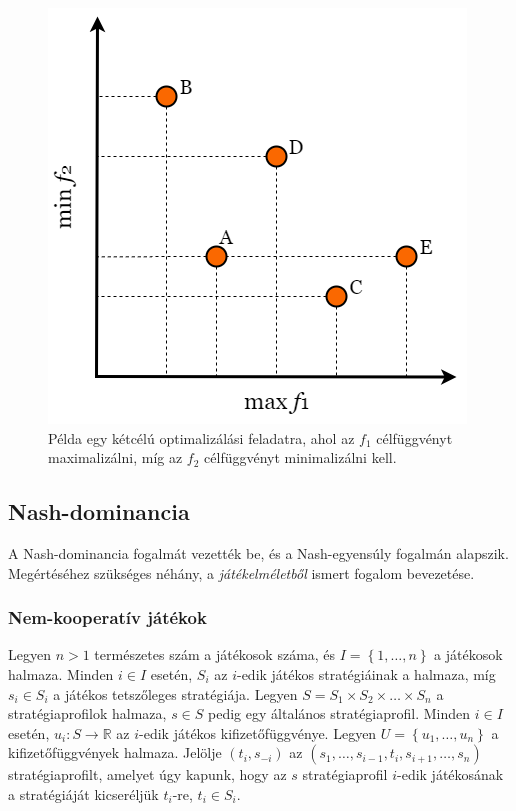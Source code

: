 \begin{figure}[t]
  \centering
  \includegraphics[scale=0.5]{images/pareto_dominance.png}
  \caption{
    Példa egy kétcélú optimalizálási feladatra, ahol az $f_1$ célfüggvényt maximalizálni, míg az $f_2$ célfüggvényt minimalizálni kell.
  }
  \label{fig:PARETO_DOMINANCE}
\end{figure}


\subsection{Nash-dominancia}
A Nash-dominancia fogalmát  vezették be, és a Nash-egyensúly fogalmán alapszik.
Megértéséhez szükséges néhány, a \emph{játékelméletből} \cite{von2007theory} ismert fogalom bevezetése.


\subsubsection{Nem-kooperatív játékok}
Legyen $n > 1$ természetes szám a játékosok száma, és $I = \left\{ 1, \dots, n \right\}$ a játékosok halmaza.
Minden $i \in I$ esetén, $S_i$ az $i$-edik játékos stratégiáinak a halmaza, míg $s_i \in S_i$ a játékos tetszőleges stratégiája.
Legyen $S = S_1 \times S_2 \times \dotsc \times S_n$ a stratégiaprofilok halmaza, $s \in S$ pedig egy általános stratégiaprofil.
Minden $i \in I$ esetén, $u_i \colon S \to \mathbb{R}$ az $i$-edik játékos kifizetőfüggvénye.
Legyen $U = \left\{ u_1, \dots, u_n \right\}$ a kifizetőfüggvények halmaza.
Jelölje $\left( t_i, s_{-i} \right)$ az $\left( s_1, \dots, s_{i-1}, t_i, s_{i+1}, \dots, s_n \right)$ stratégiaprofilt,
amelyet úgy kapunk, hogy az $s$ stratégiaprofil $i$-edik játékosának a stratégiáját kicseréljük $t_i$-re, $t_i \in S_i$.


